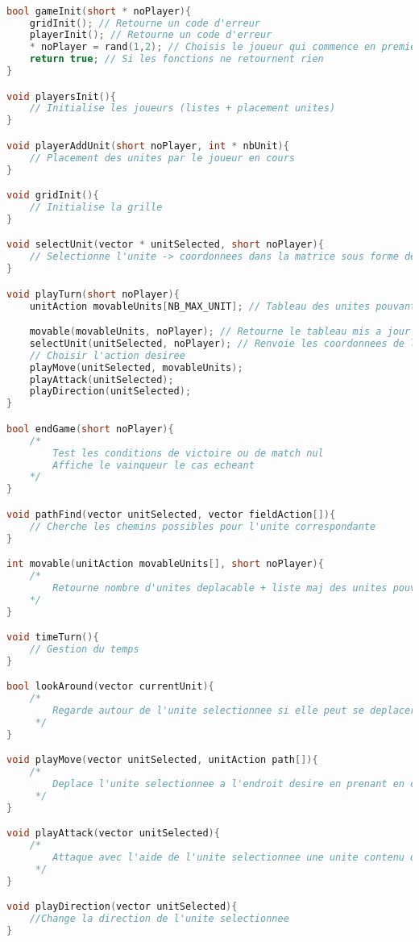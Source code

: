 \documentclass[a4paper,10pt]{extreport}
\begin{document}
\begin{lstlisting}[language=c]

bool gameInit(short * noPlayer){
	gridInit(); // Retourne un code d'erreur
	playerInit(); // Retourne un code d'erreur
	* noPlayer = rand(1,2); // Choisis le joueur qui commence en premier
	return true; // Si les fonctions ne retournent rien
}

void playersInit(){
	// Initialise les joueurs (listes + placement unites)
}

void playerAddUnit(short noPlayer, int * nbUnit){
	// Placement des unites par le joueur en cours
}

void gridInit(){
	// Initialise la grille
}

void selectUnit(vector * unitSelected, short noPlayer){
	// Selectionne l'unite -> coordonnees dans la matrice sous forme de vecteur
}

void playTurn(short noPlayer){
	unitAction movableUnits[NB_MAX_UNIT]; // Tableau des unites pouvant se deplacer + deplacement possible

	movable(movableUnits, noPlayer); // Retourne le tableau mis a jour + nombre d'unites pouvant se deplacer
	selectUnit(unitSelected, noPlayer); // Renvoie les coordonnees de l'unite selectionnee
	// Choisir l'action desiree 
	playMove(unitSelected, movableUnits);
	playAttack(unitSelected);
	playDirection(unitSelected);
}

bool endGame(short noPlayer){
	/* 	
		Test les conditions de victoire ou de match nul
	 	Affiche le vainqueur le cas echeant
	*/
}

void pathFind(vector unitSelected, vector fieldAction[]){
	// Cherche les chemins possibles pour l'unite correspondante
}

int movable(unitAction movableUnits[], short noPlayer){
	/* 	
		Retourne nombre d'unites deplacable + liste maj des unites pouvant se deplacer
	*/
}

void timeTurn(){
	// Gestion du temps
}

bool lookAround(vector currentUnit){
	/*
		Regarde autour de l'unite selectionnee si elle peut se deplacer sur une case si TP pas permise alors deplacement impossible
	 */
}

void playMove(vector unitSelected, unitAction path[]){
	/*
		Deplace l'unite selectionnee a l'endroit desire en prenant en compte les chemins possibles
	 */
}

void playAttack(vector unitSelected){
	/*
		Attaque avec l'aide de l'unite selectionnee une unite contenu dans la liste du joueur correspondant
	 */
}

void playDirection(vector unitSelected){
	//Change la direction de l'unite selectionnee
}

\end{lstlisting}
\end{document}
